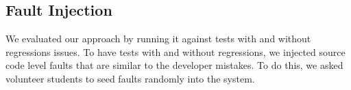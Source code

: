 




  


\subsection{Fault Injection}

We evaluated our approach by running it against  
tests with and without regressions issues.
To have tests with and without regressions, we injected source code
level faults that are similar to the developer mistakes. To do this, we asked 
volunteer students to seed faults randomly into the system. 


